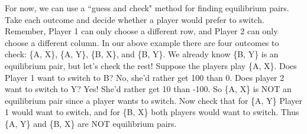 For now, we can use a ``guess and check" method for finding equilibrium pairs. Take each outcome and decide whether a player would prefer to switch. Remember, Player 1 can only choose a different row, and Player 2 can only choose a different column. In our above example there are four outcomes to check: \{A, X\}, \{A, Y\}, \{B, X\}, and \{B, Y\}. We already know \{B, Y\} is an equilibrium pair, but let's check the rest! Suppose the players play \{A, X\}. Does Player 1 want to switch to B? No, she'd rather get 100 than 0. Does player 2 want to switch to Y? Yes! She'd rather get 10 than -100. So \{A, X\} is NOT an equilibrium pair since a player wants to switch. Now check that for \{A, Y\} Player 1 would want to switch, and for \{B, X\} both players would want to switch. Thus \{A, Y\} and \{B, X\} are NOT equilibrium pairs. 
\vspace{.2in}
